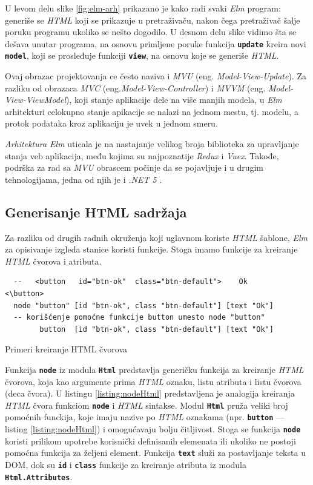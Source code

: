 \documentclass[12pt,oneside]{memoir}
\begin{document}
U levom delu slike \ref{fig:elm-arh} prikazano je kako radi svaki \emph{Elm} program: generiše
se \emph{HTML} koji se prikazuje u pretraživaču, nakon čega pretraživač šalje poruku programu
ukoliko se nešto dogodilo. U desnom delu slike vidimo šta se dešava unutar programa,
na osnovu primljene poruke funkcija \texttt{\textbf{update}} kreira novi\texttt{
\textbf{model}}, koji se prosleđuje funkciji \texttt{\textbf{view}}, na osnovu koje
se generiše \emph{HTML}.

Ovaj obrazac projektovanja ce često naziva i \emph{MVU} (eng. \emph{Model-View-Update}). Za 
razliku od obrazaca \emph{MVC} \cite{jsPatterns} (eng.\emph{Model-View-Controller}) i \emph{MVVM} \cite{jsPatterns}
(eng. \emph{Model-View-ViewModel}), koji stanje aplikacije dele na više manjih modela,
u \emph{Elm} arhitekturi celokupno stanje apikacije se nalazi na jednom mestu, tj. modelu, a
protok podataka kroz aplikaciju je uvek u jednom smeru. 

\emph{Arhitektura Elm} uticala je na nastajanje velikog broja biblioteka za upravljanje
stanja veb aplikacija, među kojima su najpoznatije \emph{Redux}\cite{redux} i \emph{Vuex}\cite{vuex}.
Takođe, podrška za rad sa \emph{MVU} obrascem počinje da se pojavljuje i u drugim tehnologijama,
jedna od njih je i \emph{.NET 5} \cite{net5}.

\subsection{Generisanje HTML sadržaja}
Za razliku od drugih radnih okruženja koji uglavnom koriste \emph{HTML} šablone, \emph{Elm} za 
opisivanje izgleda stanice koristi funkcije. Stoga imamo funkcije za kreiranje \emph{HTML}
čvorova i atributa.
\begin{listing}[h]
  \begin{verbatim}
  --   <button   id="btn-ok"  class="btn-default">    Ok      <\button>
  node "button" [id "btn-ok", class "btn-default"] [text "Ok"]
  -- korišćenje pomoćne funkcije button umesto node "button"
        button  [id "btn-ok", class "btn-default"] [text "Ok"]
  \end{verbatim}
  \caption{Primeri kreiranje HTML čvorova}
  \label{listing:nodeHtml}
  \end{listing}
  
Funkcija \texttt{\textbf{node}} iz modula \texttt{\textbf{Html}} predstavlja generičku
funkcija za kreiranje \emph{HTML} čvorova, koja kao argumente prima \emph{HTML} oznaku, listu atributa
i listu čvorova (deca čvora). U listingu \ref{listing:nodeHtml} predstavljena je analogija
kreiranja \emph{HTML} čvora funkciom \texttt{\textbf{node}} i \emph{HTML} sintakse.
Modul \texttt{\textbf{Html}} pruža veliki broj pomoćnih funckija, koje imaju nazive po
\emph{HTML} oznakama (npr. \texttt{\textbf{button}} --- listing \ref{listing:nodeHtml}) i omogućavaju bolju čitljivost. Stoga se 
funkcija \texttt{\textbf{node}} koristi prilikom upotrebe korisnički definisanih elemenata
ili ukoliko ne postoji pomoćna funkcija za željeni element. Funkcija \texttt{\textbf{text}}
služi za postavljanje teksta u DOM, dok su \texttt{\textbf{id}} i \texttt{\textbf{class}}
funkcije za kreiranje atributa iz modula \texttt{\textbf{Html.Attributes}}.
\end{document}
